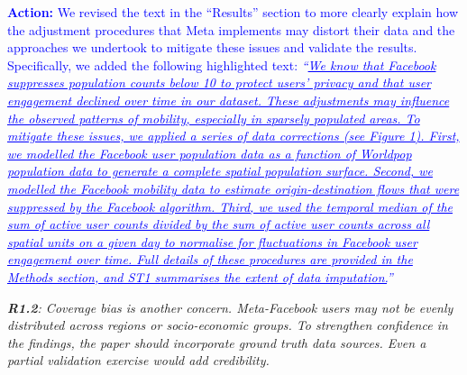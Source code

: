 \documentclass[12pt,a4paper,oneside, reqno]{amsart}
\begin{document}
\setlength{\leftskip}{1cm}\textcolor{blue}{\textbf{Action:} We revised the text in the ``Results'' section to more clearly explain how the adjustment procedures that Meta implements may distort their data and the approaches we undertook to mitigate these issues and validate the results. Specifically, we added the following highlighted text: \textit{``\uline{We know that Facebook suppresses population counts below 10 to protect users' privacy and that user engagement declined over time in our dataset. These adjustments may influence the observed patterns of mobility, especially in sparsely populated areas. To mitigate these issues, we applied a series of data corrections (see Figure 1). First, we modelled the Facebook user population data as a function of Worldpop population data to
generate a complete spatial population surface. Second, we modelled the Facebook mobility data to estimate origin-destination
flows that were suppressed by the Facebook algorithm. Third, we used the temporal median of the sum of active user counts
divided by the sum of active user counts across all spatial units on a given day to normalise for fluctuations in Facebook user engagement over time. Full details of these procedures are provided in the Methods section, and ST1 summarises the extent of
data imputation.}''}}

\setlength{\leftskip}{0cm} \textit{\textbf{R1.2}: Coverage bias is another concern. Meta-Facebook users may not be evenly distributed across regions or socio-economic groups. To strengthen confidence in the findings, the paper should incorporate ground truth data sources. Even a partial validation exercise would add credibility.}
\end{document}
